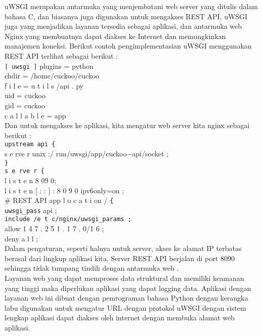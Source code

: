 \documentclass[12pt, times new roman, a4paper]{Article}
\begin{document}
	uWSGI merupakan antarmuka yang menjembatani web server yang ditulis dalam bahasa C, dan biasanya juga digunakan untuk mengakses REST API, uWSGI juga yang menjadikan layanan tersedia sebagai aplikasi, dan antarmuka web Nginx yang membuatnya dapat diakses ke Internet dan memungkinkan manajemen koneksi. Berikut contoh pengimplementasian uWSGI menggunakan REST API terlihat sebagai berikut :\\
\verb|[ uwsgi ]|
plugins = python\\
chdir = /home/cuckoo/cuckoo \\
f i l e = u t i l s /api . py\\
uid = cuckoo\\
gid = cuckoo\\
c a l l a b l e = app\\

Dan untuk mengakses ke aplikasi, kita mengatur web server kita nginx sebagai berikut :\\
\verb|upstream api {|\\
s e rve r unix :/ run/uwsgi/app/cuckoo−api/socket ;\\
\verb|}|\\
\verb|s e rve r {|\\
l i s t e n 8 09 0;\\
l i s t e n [ : : ] : 8 0 9 0 ipv6only=on ;\\
\# REST API app
l o c a t i on / \verb|{| \\
\verb|uwsgi_pass| api ;\\
\verb|include /e t c/nginx/uwsgi_params ;|\\
allow 1 4 7 . 2 5 1 . 1 7 . 0/1 6 ; \\
deny a l l ;\\

Dalam pengaturan, seperti halnya untuk server, akses ke alamat IP terbatas berasal dari lingkup aplikasi kita. Server REST API berjalan di port 8090 sehingga tidak tumpang tindih dengan antarmuka web \cite{beran2017analyza}.\\

Layanan web yang dapat memproses data struktural dan memiliki keamanan yang tinggi maka diperlukan aplikasi yang dapat logging data. Aplikasi dengan layanan web ini dibuat dengan pemrograman bahasa Python dengan kerangka labu digunakan untuk mengatur URL dengan protokol uWSGI dengan sistem lengkap aplikasi dapat diakses oleh internet dengan membuka alamat web aplikasi\cite{rudiana2015perancangan}.
\end{document}
